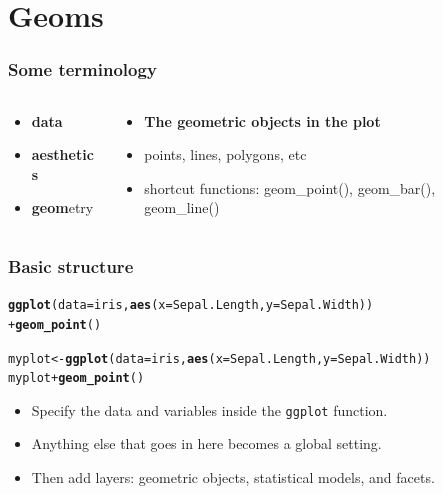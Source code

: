 \documentclass{beamer}\usepackage[]{graphicx}\usepackage[]{color}
\makeatletter
\newcommand{\hlkwd}[1]{\textcolor[rgb]{0.737,0.353,0.396}{\textbf{#1}}}%
\newenvironment{kframe}{%
 \def\at@end@of@kframe{}%
 \ifinner\ifhmode%
  \def\at@end@of@kframe{\end{minipage}}%
  \begin{minipage}{\columnwidth}%
 \fi\fi%
 \def\FrameCommand##1{\hskip\@totalleftmargin \hskip-\fboxsep
 \colorbox{shadecolor}{##1}\hskip-\fboxsep
     \hskip-\linewidth \hskip-\@totalleftmargin \hskip\columnwidth}%
 \MakeFramed {\advance\hsize-\width
   \@totalleftmargin\z@ \linewidth\hsize
   \@setminipage}}%
 {\par\unskip\endMakeFramed%
 \at@end@of@kframe}
\newenvironment{knitrout}{}{} %
\makeatother
\begin{document}

\section*{Geoms}
\frame{\sectionpage}


\begin{frame}[fragile]
\frametitle{Some terminology}
\begin{columns}[t]

\begin{column}[T]{3cm}
\begin{itemize}
    \item \textbf{\color{gray}data}
    \item \textbf{\color{gray}aesthetics}
    \item \textbf{geom}etry
\end{itemize}
\end{column}

\begin{column}[T]{8cm}
\begin{itemize}
    \item \textbf{The geometric objects in the plot}
    \item points, lines, polygons, etc
    \item shortcut functions: geom\_point(), geom\_bar(), geom\_line()
\end{itemize}
\end{column}

\end{columns}
\end{frame}


\begin{frame}[fragile]
\frametitle{Basic structure}
\begin{knitrout}\footnotesize
{}\color{fgcolor}\begin{kframe}
\begin{alltt}
\hlkwd{ggplot}(data = iris, \hlkwd{aes}(x = Sepal.Length, y = Sepal.Width))
 + \hlkwd{geom_point}()

myplot <- \hlkwd{ggplot}(data = iris, \hlkwd{aes}(x = Sepal.Length, y = Sepal.Width))
myplot + \hlkwd{geom_point}()
\end{alltt}
\end{kframe}
\end{knitrout}

\begin{itemize}
\item Specify the data and variables inside the \texttt{ggplot} function.
\item Anything else that goes in here becomes a global setting.
\item Then add layers: geometric objects, statistical models, and facets.
\end{itemize}
\end{frame}
\end{document}
